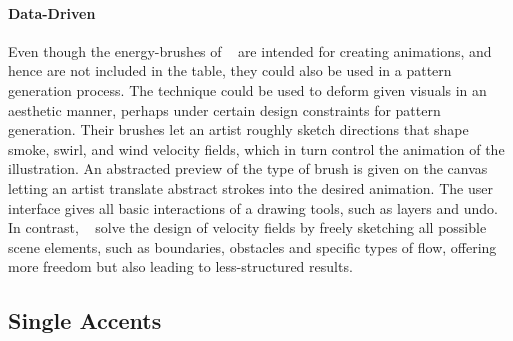 \paragraph*{Data-Driven}
Even though the energy-brushes of \citeauthor*{xing_2016_eit}~\cite{xing_2016_eit} are intended for creating animations, and hence are not included in the table, they could also be used in a pattern generation process. The technique could be used to deform given visuals in an aesthetic manner, perhaps under certain design constraints for pattern generation. Their brushes let an artist roughly sketch directions that shape smoke, swirl, and wind velocity fields, which in turn control the animation of the illustration. An abstracted preview of the type of brush is given on the canvas letting an artist translate abstract strokes into the desired animation. The user interface gives all basic interactions of a drawing tools, such as layers and undo. In contrast, \citeauthor*{hu_2019_ssf}~\cite{hu_2019_ssf} solve the design of velocity fields by freely sketching all possible scene elements, such as boundaries, obstacles and specific types of flow, offering more freedom but also leading to less-structured results. 


\subsection{Single Accents}
\label{subsubsec:analysis_single_accents}


